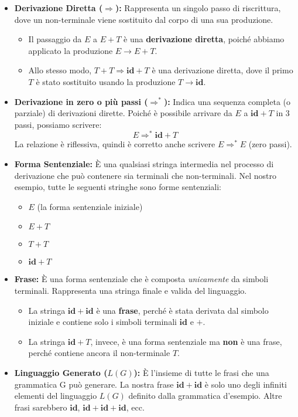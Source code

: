 \begin{itemize}
    \item \textbf{Derivazione Diretta ($\Rightarrow$):} 
    Rappresenta un singolo passo di riscrittura, dove un non-terminale viene sostituito dal corpo di una sua produzione. 
    \begin{itemize}
        \item Il passaggio da $E$ a $E + T$ è una \textbf{derivazione diretta}, poiché abbiamo applicato la produzione $E \rightarrow E + T$.
        \item Allo stesso modo, $T + T \Rightarrow \mathbf{id} + T$ è una derivazione diretta, dove il primo $T$ è stato sostituito usando la produzione $T \rightarrow \mathbf{id}$.
    \end{itemize}

    \item \textbf{Derivazione in zero o più passi ($\Rightarrow^*$):} 
    Indica una sequenza completa (o parziale) di derivazioni dirette. Poiché è possibile arrivare da $E$ a $\mathbf{id} + T$ in 3 passi, possiamo scrivere:
    \[ E \Rightarrow^* \mathbf{id} + T \]
    La relazione è riflessiva, quindi è corretto anche scrivere $E \Rightarrow^* E$ (zero passi).
    
    \item \textbf{Forma Sentenziale:} 
    È una qualsiasi stringa intermedia nel processo di derivazione che può contenere sia terminali che non-terminali. Nel nostro esempio, tutte le seguenti stringhe sono forme sentenziali:
    \begin{itemize}
        \item $E$ (la forma sentenziale iniziale)
        \item $E + T$
        \item $T + T$
        \item $\mathbf{id} + T$
    \end{itemize}

    \item \textbf{Frase:} 
    È una forma sentenziale che è composta \textit{unicamente} da simboli terminali. Rappresenta una stringa finale e valida del linguaggio.
    \begin{itemize}
        \item La stringa $\mathbf{id} + \mathbf{id}$ è una \textbf{frase}, perché è stata derivata dal simbolo iniziale e contiene solo i simboli terminali $\mathbf{id}$ e $+$.
        \item La stringa $\mathbf{id} + T$, invece, è una forma sentenziale ma \textbf{non} è una frase, perché contiene ancora il non-terminale $T$.
    \end{itemize}

    \item \textbf{Linguaggio Generato ($L(G)$):} 
    È l'insieme di tutte le frasi che una grammatica G può generare. La nostra frase $\mathbf{id} + \mathbf{id}$ è solo uno degli infiniti elementi del linguaggio $L(G)$ definito dalla grammatica d'esempio. Altre frasi sarebbero $\mathbf{id}$, $\mathbf{id} + \mathbf{id} + \mathbf{id}$, ecc.
    
\end{itemize}
